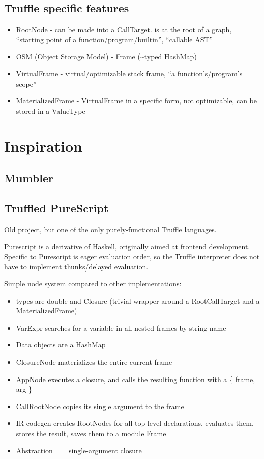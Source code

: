 \documentclass[english,zadani,odsaz]{fitthesis}
\begin{document}
\subsection{Truffle specific features}
\label{sec:orgbc58382}
\begin{itemize}
\item RootNode - can be made into a CallTarget. is at the root of a graph, ``starting
point of a function/program/builtin'', ``callable AST''
\item OSM (Object Storage Model) - Frame (\textasciitilde{}typed HashMap)
\item VirtualFrame - virtual/optimizable stack frame, ``a function's/program's scope''
\item MaterializedFrame - VirtualFrame in a specific form, not optimizable, can be
stored in a ValueType
\end{itemize}

\section{Inspiration}
\label{sec:org19ef1ec}
\subsection{Mumbler}
\label{sec:orgadacfc9}

\subsection{Truffled PureScript}
\label{sec:org69ada9d}
Old project, but one of the only purely-functional Truffle languages.

Purescript is a derivative of Haskell, originally aimed at frontend
development. Specific to Purescript is eager evaluation order, so the Truffle
interpreter does not have to implement thunks/delayed evaluation.

Simple node system compared to other implementations:
\begin{itemize}
\item types are double and Closure (trivial wrapper around a RootCallTarget and a MaterializedFrame)
\item VarExpr searches for a variable in all nested frames by string name
\item Data objects are a HashMap
\item ClosureNode materializes the entire current frame
\item AppNode executes a closure, and calls the resulting function with a \{ frame, arg \}
\item CallRootNode copies its single argument to the frame
\item IR codegen creates RootNodes for all top-level declarations, evaluates them,
stores the result, saves them to a module Frame
\item Abstraction == single-argument closure
\end{itemize}
\end{document}
